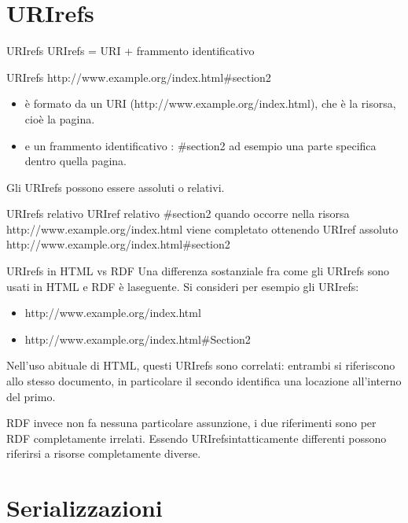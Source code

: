 \section{URIrefs}
\begin{definition}{URIrefs}
    URIrefs = URI + frammento identificativo
\end{definition}
\begin{example}{URIrefs}
    http://www.example.org/index.html\#section2

    \begin{itemize}
        \item è formato da un URI (http://www.example.org/index.html), che è la risorsa, cioè la pagina.
        \item e un frammento identificativo : \#section2 ad esempio una parte specifica dentro quella pagina.
    \end{itemize}
\end{example}
Gli URIrefs possono essere assoluti o relativi.

\begin{example}{URIrefs relativo}
    URIref relativo \#section2 quando occorre nella risorsa http://www.example.org/index.html 
    viene completato ottenendo URIref assoluto http://www.example.org/index.html\#section2
\end{example}

\begin{observation}{URIrefs in HTML vs RDF}
    Una differenza sostanziale fra come gli URIrefs sono usati in HTML e RDF è laseguente. 
    Si consideri per esempio gli URIrefs:
    \begin{itemize}
        \item http://www.example.org/index.html
        \item http://www.example.org/index.html\#Section2
    \end{itemize}
    Nell'uso abituale di HTML, questi URIrefs sono correlati: entrambi si riferiscono allo stesso documento, 
    in particolare il secondo identifica una locazione all'interno del primo.


    RDF invece non fa nessuna particolare assunzione, i due riferimenti sono per RDF
    completamente irrelati. Essendo URIrefsintatticamente differenti possono riferirsi a
    risorse completamente diverse. 
\end{observation}
\section{Serializzazioni}

